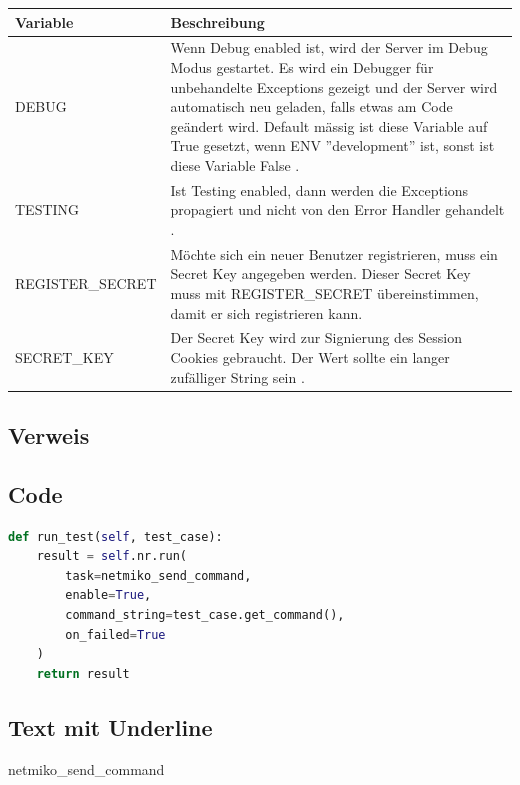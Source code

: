 \begin{tabularx}{\textwidth}{| l | X |}
\hline
\textbf{Variable} & \textbf{Beschreibung} \\
\hline
DEBUG &  Wenn Debug enabled ist, wird der Server im Debug Modus gestartet. Es wird ein Debugger für unbehandelte Exceptions gezeigt und der Server wird automatisch neu geladen, falls etwas am Code geändert wird. 
\newline
Default mässig ist diese Variable auf True gesetzt,  wenn ENV ''development'' ist, sonst ist diese Variable False \cite{flask:config}. \\
\hline
TESTING &  Ist Testing enabled, dann werden die Exceptions propagiert und nicht von den Error Handler gehandelt \cite{flask:config}. \\
\hline
REGISTER\_SECRET & Möchte sich ein neuer Benutzer registrieren, muss ein Secret Key angegeben werden. Dieser Secret Key muss mit REGISTER\_SECRET übereinstimmen, damit er sich registrieren kann. \\
\hline
SECRET\_KEY &  Der Secret Key wird zur Signierung des Session Cookies gebraucht. Der Wert sollte ein langer zufälliger String sein \cite{flask:config}.\\
\hline
\end{tabularx}



\subsection{Verweis}

\cite{django:nachteile}


\subsection{Code}

\begin{lstlisting}[caption={Example Runner}, language=Python]
def run_test(self, test_case):
    result = self.nr.run(
        task=netmiko_send_command,
        enable=True,
        command_string=test_case.get_command(),
        on_failed=True
    )
    return result
\end{lstlisting}


\subsection{Text mit Underline}

netmiko\_send\_command


